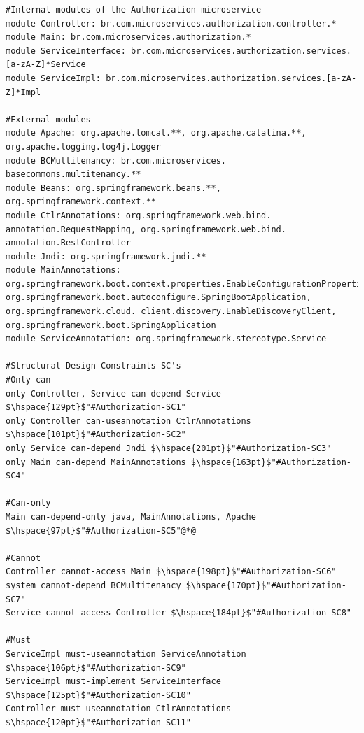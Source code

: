 \documentclass[12pt]{article}
\begin{document}
\begin{lstlisting}[style=colorido, caption={ \textcolor{blue}{Authorization microservice's architectural design specification.}},label={list:especArquiteturalAuthorization}
]
#Internal modules of the Authorization microservice
module Controller: br.com.microservices.authorization.controller.*
module Main: br.com.microservices.authorization.*
module ServiceInterface: br.com.microservices.authorization.services.[a-zA-Z]*Service
module ServiceImpl: br.com.microservices.authorization.services.[a-zA-Z]*Impl

#External modules
module Apache: org.apache.tomcat.**, org.apache.catalina.**, org.apache.logging.log4j.Logger
module BCMultitenancy: br.com.microservices. basecommons.multitenancy.**
module Beans: org.springframework.beans.**, org.springframework.context.**
module CtlrAnnotations: org.springframework.web.bind. annotation.RequestMapping, org.springframework.web.bind. annotation.RestController
module Jndi: org.springframework.jndi.**
module MainAnnotations: org.springframework.boot.context.properties.EnableConfigurationProperties, org.springframework.boot.autoconfigure.SpringBootApplication, org.springframework.cloud. client.discovery.EnableDiscoveryClient,  org.springframework.boot.SpringApplication
module ServiceAnnotation: org.springframework.stereotype.Service

#Structural Design Constraints SC's
#Only-can
only Controller, Service can-depend Service	$\hspace{129pt}$"#Authorization-SC1"
only Controller can-useannotation CtlrAnnotations $\hspace{101pt}$"#Authorization-SC2"
only Service can-depend Jndi $\hspace{201pt}$"#Authorization-SC3"
only Main can-depend MainAnnotations $\hspace{163pt}$"#Authorization-SC4"
	
#Can-only
Main can-depend-only java, MainAnnotations, Apache $\hspace{97pt}$"#Authorization-SC5"@*@

#Cannot
Controller cannot-access Main $\hspace{198pt}$"#Authorization-SC6"
system cannot-depend BCMultitenancy	$\hspace{170pt}$"#Authorization-SC7"
Service cannot-access Controller $\hspace{184pt}$"#Authorization-SC8"

#Must
ServiceImpl must-useannotation ServiceAnnotation $\hspace{106pt}$"#Authorization-SC9"
ServiceImpl must-implement ServiceInterface 	$\hspace{125pt}$"#Authorization-SC10"
Controller must-useannotation CtlrAnnotations $\hspace{120pt}$"#Authorization-SC11"
\end{lstlisting}
\end{document}

